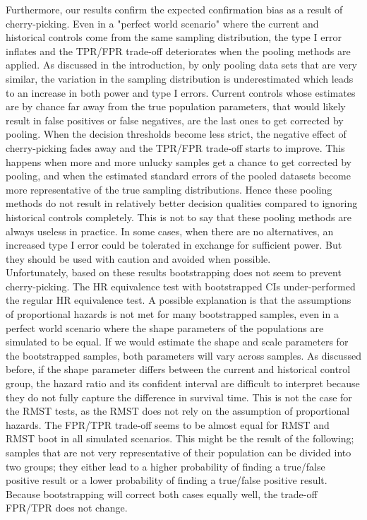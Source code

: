 \documentclass[Royal,sagev,times]{sagej}
\begin{document}
Furthermore, our results confirm the expected confirmation bias as a result of cherry-picking. Even in a "perfect world scenario" where the current and historical controls come from the same sampling distribution, the type I error inflates and the TPR/FPR trade-off deteriorates when the pooling methods are applied. As discussed in the introduction, by only pooling data sets that are very similar, the variation in the sampling distribution is underestimated which leads to an increase in both power and type I errors. Current controls whose estimates are by chance far away from the true population parameters, that would likely result in false positives or false negatives, are the last ones to get corrected by pooling. When the decision thresholds become less strict, the negative effect of cherry-picking fades away and the TPR/FPR trade-off starts to improve. This happens when more and more unlucky samples get a chance to get corrected by pooling, and when the estimated standard errors of the pooled datasets become more representative of the true sampling distributions. 
Hence these pooling methods do not result in relatively better decision qualities compared to ignoring historical controls completely. This is not to say that these pooling methods are always useless in practice. In some cases, when there are no alternatives, an increased type I error could be tolerated in exchange for sufficient power. But they should be used with caution and avoided when possible.
\\

Unfortunately, based on these results bootstrapping does not seem to prevent cherry-picking. The HR equivalence test with bootstrapped CIs under-performed the regular HR equivalence test. A possible explanation is that the assumptions of proportional hazards is not met for many bootstrapped samples, even in a perfect world scenario where the shape parameters of the populations are simulated to be equal. If we would estimate the shape and scale parameters for the bootstrapped samples, both parameters will vary across samples. As discussed before, if the shape parameter differs between the current and historical control group, the hazard ratio and its confident interval are difficult to interpret because they do not fully capture the difference in survival time. 
This is not the case for the RMST tests, as the RMST does not rely on the assumption of proportional hazards. The FPR/TPR trade-off seems to be almost equal for RMST and RMST boot in all simulated scenarios. This might be the result of the following; samples that are not very representative of their population can be divided into two groups; they either lead to a higher probability of finding a true/false positive result or a lower probability of finding a true/false positive result. Because bootstrapping will correct both cases equally well, the trade-off FPR/TPR does not change.
\\
\end{document}
